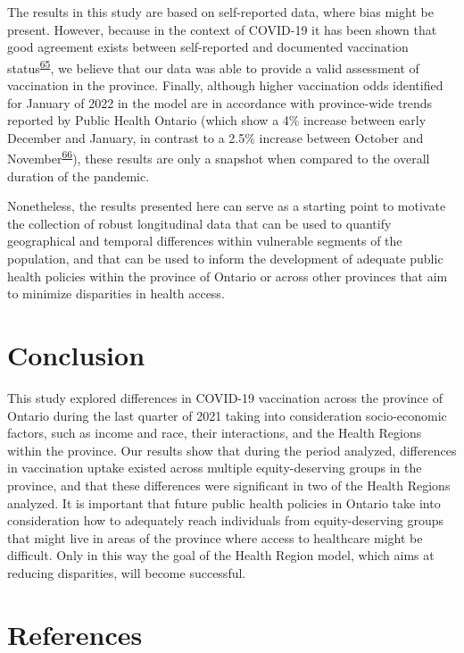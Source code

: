 \documentclass[
  letterpaper,
  DIV=11,
  numbers=noendperiod]{scrartcl}
\begin{document}
The results in this study are based on self-reported data, where bias
might be present. However, because in the context of COVID-19 it has
been shown that good agreement exists between self-reported and
documented vaccination
status\textsuperscript{\protect\hyperlink{ref-stephenson2022}{65}}, we
believe that our data was able to provide a valid assessment of
vaccination in the province. Finally, although higher vaccination odds
identified for January of 2022 in the model are in accordance with
province-wide trends reported by Public Health Ontario (which show a 4\%
increase between early December and January, in contrast to a 2.5\%
increase between October and
November\textsuperscript{\protect\hyperlink{ref-ontario-covid}{66}}),
these results are only a snapshot when compared to the overall duration
of the pandemic.

Nonetheless, the results presented here can serve as a starting point to
motivate the collection of robust longitudinal data that can be used to
quantify geographical and temporal differences within vulnerable
segments of the population, and that can be used to inform the
development of adequate public health policies within the province of
Ontario or across other provinces that aim to minimize disparities in
health access.

\hypertarget{conclusion}{%
\section{Conclusion}\label{conclusion}}

This study explored differences in COVID-19 vaccination across the
province of Ontario during the last quarter of 2021 taking into
consideration socio-economic factors, such as income and race, their
interactions, and the Health Regions within the province. Our results
show that during the period analyzed, differences in vaccination uptake
existed across multiple equity-deserving groups in the province, and
that these differences were significant in two of the Health Regions
analyzed. It is important that future public health policies in Ontario
take into consideration how to adequately reach individuals from
equity-deserving groups that might live in areas of the province where
access to healthcare might be difficult. Only in this way the goal of
the Health Region model, which aims at reducing disparities, will become
successful.

\hypertarget{references}{%
\section{References}\label{references}}
\end{document}
